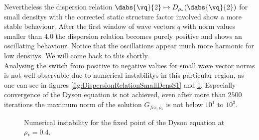 Nevertheless the dispersion relation $\dabs{\vq}{2}\mapsto D_{\rho_*}(\dabs{\vq}{2})$ for small densitys with the corrected static structure factor involved show a more stable behaviour. After the first window of wave vectors $q$ with norm values smaller than $4.0$ the dispersion relation becomes purely positive and shows an oscillating behaviour. Notice that the oscillations appear much more harmonic for low densitys. We will come back to this shortly. \\

Analysing the switch from positive to negative values for small wave vector norms is not well observable due to numerical instabilitys in this particular region, as one can see in figures \ref{fig:DispersionRelationSmallDensS1} and \ref{fig:FixedPointNumericalInstability}. Especially convergence of the Dyson equation is not achieved, even after more than $2500$ iterations the maximum norm of the solution $G_{\mathit{fix},\rho_*}$ is not below $10^{1}$ to $10^{3}$.
\begin{figure}[H]
    \centering
    \caption{Numerical instability for the fixed point of the Dyson equation at $\rho_* = 0.4$.}
    \label{fig:FixedPointNumericalInstability}
\end{figure}

